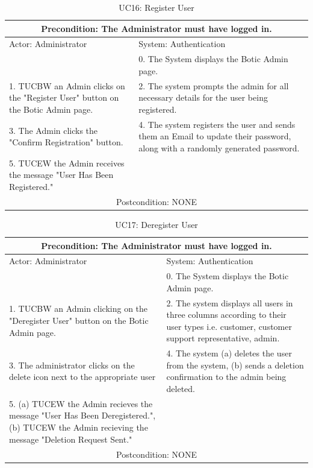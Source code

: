 \documentclass[11pt]{article}
\begin{document}
\begin{table}[h!]
	\centering
	\begin{tabular}{|p{8cm}|p{8cm}|}
		\hline
		\multicolumn{2}{|c|}{Precondition: The Administrator must have logged in.} \\
		\hline
		Actor: Administrator & System: Authentication \\
		\hline
		 & 0. The System displays the Botic Admin page.\\
		\hline
		1. TUCBW an Admin clicks on the "Register User" button on the Botic Admin page. & 2. The system prompts the admin for all necessary details for the user being registered. \\
		\hline
		3. The Admin clicks the "Confirm Registration" button. & \cellcolor{blue} 4. The system registers the user and sends them an Email to update their password, along with a randomly generated password. \\
		\hline
		5. TUCEW the Admin receives the message "User Has Been Registered." & \\
		\hline
		\multicolumn{2}{|c|}{Postcondition: NONE} \\
		\hline
	\end{tabular}
	\caption{UC16: Register User}
\end{table}

\begin{table}[H]
	\centering
	\begin{tabular}{|p{8cm}|p{8cm}|}
		\hline
		\multicolumn{2}{|c|}{Precondition: The Administrator must have logged in.} \\
		\hline
		Actor: Administrator & System: Authentication \\
		\hline
		& 0. The System displays the Botic Admin page. \\
		\hline
		1. TUCBW an Admin clicking on the "Deregister User" button on the Botic Admin page. & \cellcolor{blue} 2. The system displays all users in three columns according to their user types i.e. customer, customer support representative, admin.\\
		\hline
		3. The administrator clicks on the delete icon next to the appropriate user & \cellcolor{blue} 4. The system (a) deletes the user from the system, (b) sends a deletion confirmation to the admin being deleted. \\
		\hline
		5. (a) TUCEW the Admin recieves the message "User Has Been Deregistered.", (b) TUCEW the Admin recieving the message "Deletion Request Sent." & \\
		\hline
		\multicolumn{2}{|c|}{Postcondition: NONE} \\
		\hline
	\end{tabular}
	\caption{UC17: Deregister User}
\end{table}
 
\end{document}
